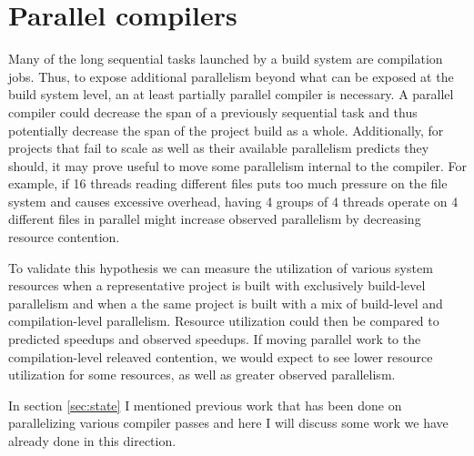 \documentclass[10pt]{article}
\begin{document}
\section{Parallel compilers}


Many of the long sequential tasks launched by a build system are compilation jobs.  Thus, to
expose additional parallelism beyond what can be exposed at the build system level, an at least
partially parallel compiler is necessary.  A parallel compiler could decrease the span
of a previously sequential task and thus potentially decrease the span of the project build as a
whole.  Additionally, for projects that fail to scale as well as their available parallelism
predicts they should, it may prove useful to move some parallelism internal to the compiler.
For example, if 16 threads reading different files puts too much pressure on the file
system and causes excessive overhead, having 4 groups of 4 threads operate on 4 different files
in parallel might increase observed parallelism by decreasing resource contention.


To validate this hypothesis we can measure the utilization of various system resources when
a representative project is built with exclusively build-level parallelism and when a
the same project is built with a mix of build-level and compilation-level parallelism.  Resource utilization
could then be compared to predicted speedups and observed speedups.  If moving parallel work
to the compilation-level releaved contention, we would expect to see lower resource utilization
for some resources, as well as greater observed parallelism.


In section \ref{sec:state} I mentioned previous work that has been done on parallelizing various compiler
passes and here I will discuss some work we have already done in this direction. 
\end{document}
